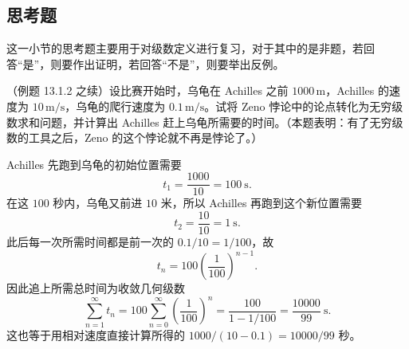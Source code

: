 \subsection{思考题}

这一小节的思考题主要用于对级数定义进行复习，对于其中的是非题，若回答“是”，则要作出证明，若回答“不是”，则要举出反例。

\begin{xthought}[1]
（例题 13.1.2 之续）设比赛开始时，乌龟在 Achilles 之前 $1000\,\mathrm m$，Achilles 的速度为 $10\,\mathrm{m/s}$，乌龟的爬行速度为 $0.1\,\mathrm{m/s}$。试将 Zeno 悖论中的论点转化为无穷级数求和问题，并计算出 Achilles 赶上乌龟所需要的时间。（本题表明：有了无穷级数的工具之后，Zeno 的这个悖论就不再是悖论了。）
\end{xthought}
\begin{xsolution}
Achilles 先跑到乌龟的初始位置需要
\[
 t_1=\frac{1000}{10}=100\ \text{s}.
\]
在这 $100$ 秒内，乌龟又前进 $10$ 米，所以 Achilles 再跑到这个新位置需要
\[
 t_2=\frac{10}{10}=1\ \text{s}.
\]
此后每一次所需时间都是前一次的 $0.1/10=1/100$，故
\[
 t_n=100\left(\frac1{100}\right)^{n-1}.
\]
因此追上所需总时间为收敛几何级数
\[
 \sum_{n=1}^{\infty}t_n
 =100\sum_{n=0}^{\infty}\left(\frac1{100}\right)^n
 =\frac{100}{1-1/100}
 =\frac{10000}{99}\ \text{s}.
\]
这也等于用相对速度直接计算所得的 $1000/(10-0.1)=10000/99$ 秒。
\end{xsolution}


